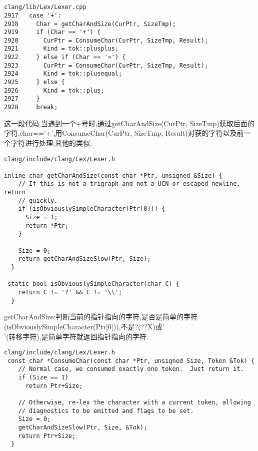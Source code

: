 \section{}
\subsection{}
\begin{lstlisting}
clang/lib/Lex/Lexer.cpp
2917   case '+': 
2918     Char = getCharAndSize(CurPtr, SizeTmp); 
2919     if (Char == '+') { 
2920       CurPtr = ConsumeChar(CurPtr, SizeTmp, Result); 
2921       Kind = tok::plusplus; 
2922     } else if (Char == '=') { 
2923       CurPtr = ConsumeChar(CurPtr, SizeTmp, Result); 
2924       Kind = tok::plusequal; 
2925     } else { 
2926       Kind = tok::plus; 
2927     } 
2928     break;
\end{lstlisting}

\par{这一段代码,当遇到一个+号时,通过getCharAndSize(CurPtr, SizeTmp)获取后面的字符,char=='+',用ConsumeChar(CurPtr, SizeTmp, Result)对获的字符以及前一个字符进行处理.其他的类似.}
\begin{lstlisting}
clang/include/clang/Lex/Lexer.h
 
inline char getCharAndSize(const char *Ptr, unsigned &Size) { 
    // If this is not a trigraph and not a UCN or escaped newline, return 
    // quickly. 
    if (isObviouslySimpleCharacter(Ptr[0])) { 
      Size = 1;     
      return *Ptr; 
    }                           

    Size = 0; 
    return getCharAndSizeSlow(Ptr, Size); 
  } 

 static bool isObviouslySimpleCharacter(char C) { 
    return C != '?' && C != '\\'; 
  } 
\end{lstlisting}
\par{getCharAndSize:判断当前的指针指向的字符,是否是简单的字符(isObviouslySimpleCharacter(Ptr[0])),不是?(??X)或'\\'(转移字符),是简单字符就返回指针指向的字符.}
\begin{lstlisting}
clang/include/clang/Lex/Lexer.h 
 const char *ConsumeChar(const char *Ptr, unsigned Size, Token &Tok) { 
    // Normal case, we consumed exactly one token.  Just return it. 
    if (Size == 1) 
      return Ptr+Size; 

    // Otherwise, re-lex the character with a current token, allowing 
    // diagnostics to be emitted and flags to be set. 
    Size = 0; 
    getCharAndSizeSlow(Ptr, Size, &Tok); 
    return Ptr+Size; 
  }
\end{lstlisting}

